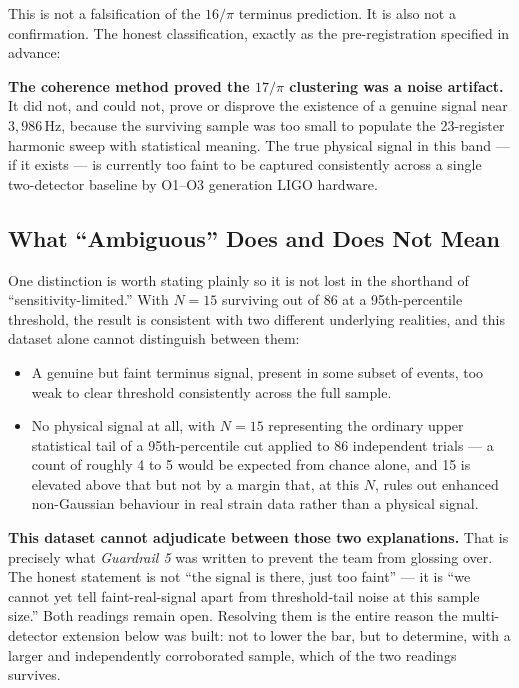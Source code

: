 \documentclass[11pt, letterpaper, openany]{book}
\begin{document}
This is not a falsification of the $16/\pi$ terminus prediction. It is
also not a confirmation. The honest classification, exactly as the
pre-registration specified in advance:

\begin{signalbox}
\textbf{The coherence method proved the $17/\pi$ clustering was a noise
artifact.} It did not, and could not, prove or disprove the existence of
a genuine signal near $3{,}986$\,Hz, because the surviving sample was too
small to populate the 23-register harmonic sweep with statistical meaning.
The true physical signal in this band --- if it exists --- is currently
too faint to be captured consistently across a single two-detector
baseline by O1--O3 generation LIGO hardware.
\end{signalbox}


\subsection*{What ``Ambiguous'' Does and Does Not Mean}
 
One distinction is worth stating plainly so it is not lost in the
shorthand of ``sensitivity-limited.'' With $N=15$ surviving out of 86 at
a 95th-percentile threshold, the result is consistent with two different
underlying realities, and this dataset alone cannot distinguish between
them:
 
\begin{itemize}
\item A genuine but faint terminus signal, present in some subset of
  events, too weak to clear threshold consistently across the full
  sample.
\item No physical signal at all, with $N=15$ representing the ordinary
  upper statistical tail of a 95th-percentile cut applied to 86
  independent trials --- a count of roughly 4 to 5 would be expected
  from chance alone, and 15 is elevated above that but not by a margin
  that, at this $N$, rules out enhanced non-Gaussian behaviour in real
  strain data rather than a physical signal.
\end{itemize}
 
\begin{warningbox}
\textbf{This dataset cannot adjudicate between those two explanations.}
That is precisely what \emph{Guardrail 5} was written to prevent the
team from glossing over. The honest statement is not ``the signal is
there, just too faint'' --- it is ``we cannot yet tell faint-real-signal
apart from threshold-tail noise at this sample size.'' Both readings
remain open. Resolving them is the entire reason the multi-detector
extension below was built: not to lower the bar, but to determine, with
a larger and independently corroborated sample, which of the two
readings survives.
\end{warningbox}
 
\end{document}
